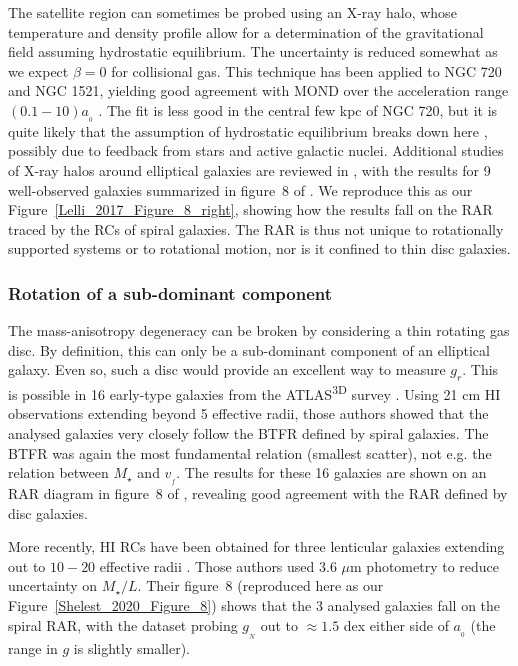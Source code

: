 \documentclass[fleqn,usenatbib,useAMS]{mnras} %
\begin{document}
The satellite region can sometimes be probed using an X-ray halo, whose temperature and density profile allow for a determination of the gravitational field assuming hydrostatic equilibrium. The uncertainty is reduced somewhat as we expect $\beta = 0$ for collisional gas. This technique has been applied to NGC 720 and NGC 1521, yielding good agreement with MOND over the acceleration range $\left( 0.1 - 10 \right) a_{_0}$ \citep{Milgrom_2012}. The fit is less good in the central few kpc of NGC 720, but it is quite likely that the assumption of hydrostatic equilibrium breaks down here \citep{Diehl_2007}, possibly due to feedback from stars and active galactic nuclei. Additional studies of X-ray halos around elliptical galaxies are reviewed in \citet{Buote_2012}, with the results for 9 well-observed galaxies summarized in figure~8 of \citet{Lelli_2017}. We reproduce this as our Figure~\ref{Lelli_2017_Figure_8_right}, showing how the results fall on the RAR traced by the RCs of spiral galaxies. The RAR is thus not unique to rotationally supported systems or to rotational motion, nor is it confined to thin disc galaxies.


\subsubsection{Rotation of a sub-dominant component}
\label{Sub_dominant_rotating_component}

The mass-anisotropy degeneracy can be broken by considering a thin rotating gas disc. By definition, this can only be a sub-dominant component of an elliptical galaxy. Even so, such a disc would provide an excellent way to measure $g_r$. This is possible in 16 early-type galaxies from the ATLAS\textsuperscript{3D} survey \citep{Heijer_2015}. Using 21 cm HI observations extending beyond 5 effective radii, those authors showed that the analysed galaxies very closely follow the BTFR defined by spiral galaxies. The BTFR was again the most fundamental relation (smallest scatter), not e.g. the relation between $M_{\star}$ and $v_{_f}$. The results for these 16 galaxies are shown on an RAR diagram in figure~8 of \citet{Lelli_2017}, revealing good agreement with the RAR defined by disc galaxies.

More recently, HI RCs have been obtained for three lenticular galaxies extending out to $10-20$ effective radii \citep{Shelest_2020}. Those authors used 3.6 $\mu$m photometry to reduce uncertainty on $M_{\star}/L$. Their figure~8 (reproduced here as our Figure~\ref{Shelest_2020_Figure_8}) shows that the 3 analysed galaxies fall on the spiral RAR, with the dataset probing $g_{_N}$ out to $\approx 1.5$ dex either side of $a_{_0}$ (the range in $g$ is slightly smaller).
\end{document}
